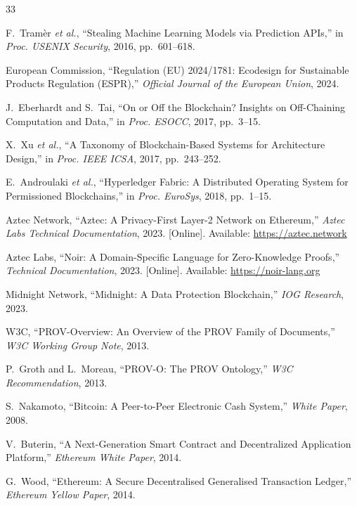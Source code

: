 \documentclass[conference]{IEEEtran}
\begin{document}
\begin{thebibliography}{33}

F.~Tram\`{e}r {\em et al.}, ``Stealing Machine Learning Models via Prediction
APIs,'' in \textit{Proc. USENIX Security}, 2016, pp.~601--618.

European Commission, ``Regulation (EU) 2024/1781: Ecodesign for Sustainable
Products Regulation (ESPR),'' \textit{Official Journal of the European Union},
2024.

J.~Eberhardt and S.~Tai, ``On or Off the Blockchain? Insights on Off-Chaining
Computation and Data,'' in \textit{Proc. ESOCC}, 2017, pp.~3--15.

X.~Xu {\em et al.}, ``A Taxonomy of Blockchain-Based Systems for Architecture
Design,'' in \textit{Proc. IEEE ICSA}, 2017, pp.~243--252.

E.~Androulaki {\em et al.}, ``Hyperledger Fabric: A Distributed Operating
System for Permissioned Blockchains,'' in \textit{Proc. EuroSys}, 2018,
pp.~1--15.

Aztec Network, ``Aztec: A Privacy-First Layer-2 Network on Ethereum,''
\textit{Aztec Labs Technical Documentation}, 2023. [Online]. Available:
\url{https://aztec.network}

Aztec Labs, ``Noir: A Domain-Specific Language for Zero-Knowledge Proofs,''
\textit{Technical Documentation}, 2023. [Online]. Available:
\url{https://noir-lang.org}

Midnight Network, ``Midnight: A Data Protection Blockchain,''
\textit{IOG Research}, 2023.

W3C, ``PROV-Overview: An Overview of the PROV Family of Documents,''
\textit{W3C Working Group Note}, 2013.

P.~Groth and L.~Moreau, ``PROV-O: The PROV Ontology,''
\textit{W3C Recommendation}, 2013.

S.~Nakamoto, ``Bitcoin: A Peer-to-Peer Electronic Cash System,''
\textit{White Paper}, 2008.

V.~Buterin, ``A Next-Generation Smart Contract and Decentralized Application
Platform,'' \textit{Ethereum White Paper}, 2014.

G.~Wood, ``Ethereum: A Secure Decentralised Generalised Transaction Ledger,''
\textit{Ethereum Yellow Paper}, 2014.


\end{thebibliography}
\end{document}
